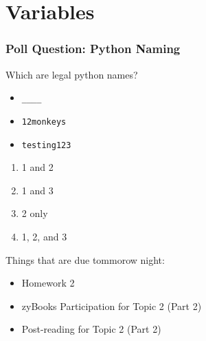 \documentclass{beamer}
\begin{document}
\section{Variables}

%
%
%
\begin{frame}[fragile]
  \frametitle{Poll Question: Python Naming}
  \begin{minipage}{0.49\textwidth}
    Which are legal python names?
    \begin{itemize}
      \item \lstinline{____}
      \item \lstinline{12monkeys}
      \item \lstinline{testing123}
    \end{itemize}
  \end{minipage}
  \begin{minipage}{0.49\textwidth}
    \begin{enumerate}[A]
      \item 1 and 2
      \item 1 and 3
      \item 2 only
      \item 1, 2, and 3
    \end{enumerate}
  \end{minipage}
\end{frame}

%
%
%
\begin{frame}
  Things that are due tommorow night:
    \begin{itemize}
      \item Homework 2
      \item zyBooks Participation for Topic 2 (Part 2) 
      \item Post-reading for Topic 2 (Part 2)
    \end{itemize}
\end{frame}
\end{document}
